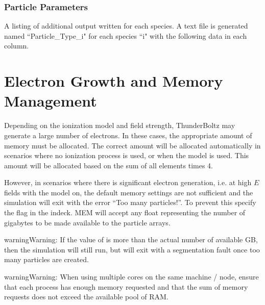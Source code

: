 \documentclass[letterpaper,10pt,english,openany,oneside]{sphinxmanual}
\begin{document}


\subsection{Particle Parameters}
A listing of additional output written for each species. A text
file is generated named ``Particle\_Type\_i" for each species ``i"
with the following data in each column.





\chapter{Electron Growth and Memory Management}
\label{\detokenize{short_index:electron-growth-and-memory-management}}\label{\detokenize{short_index:memory}}
\sphinxAtStartPar
Depending on the ionization model and field strength,
ThunderBoltz may generate a large number of electrons.
In these cases, the appropriate amount of memory must be
allocated. The correct amount will be allocated automatically
in scenarios where no ionization process is used,
or when the  model is used. This amount
will be allocated based on the sum of all  elements
times 4.

\sphinxAtStartPar
However, in scenarios where there is significant electron generation,
i.e. at high \(E\) fields with the  model on,
the default memory settings are not sufficient and the simulation
will exit with the error “Too many particles!”. To prevent this
specify the  flag in the indeck. MEM will accept any
float representing the number of gigabytes to be made available
to the particle arrays.

\begin{sphinxadmonition}{warning}{Warning:}
\sphinxAtStartPar
If the value of  is more than the actual number of
available GB, then the simulation will still run, but will
exit with a segmentation fault once too many particles are
created.
\end{sphinxadmonition}

\begin{sphinxadmonition}{warning}{Warning:}
\sphinxAtStartPar
When using multiple cores on the same machine / node, ensure
that each process has enough memory requested and that
the sum of memory requests does not exceed the available
pool of RAM.
\end{sphinxadmonition}
\end{document}
